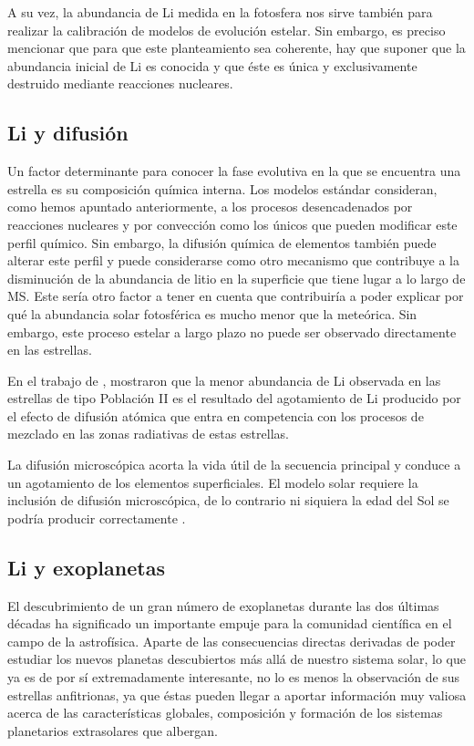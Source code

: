 A su vez, la abundancia de Li medida en la fotosfera nos sirve también para realizar la calibración de modelos de evolución estelar. Sin embargo, es preciso mencionar que para que este planteamiento sea coherente, hay que suponer que la abundancia inicial de Li es conocida y que éste es única y exclusivamente destruido mediante reacciones nucleares.\par

\subsection{Li y difusión}
Un factor determinante para conocer la fase evolutiva en la que se encuentra una estrella es su composición química interna. Los modelos estándar consideran, como hemos apuntado anteriormente, a los procesos desencadenados por reacciones nucleares y por convección como los únicos que pueden modificar este perfil químico. Sin embargo, la difusión química de elementos también puede alterar este perfil y puede considerarse como otro mecanismo que contribuye a la disminución de la abundancia de litio en la superficie que tiene lugar a lo largo de MS. Este sería otro factor a tener en cuenta que contribuiría a poder explicar por qué la abundancia solar fotosférica es mucho menor que la meteórica. Sin embargo, este proceso estelar a largo plazo no puede ser observado directamente en las estrellas.\par

En el trabajo de \cite{Richard2004}, mostraron que la menor abundancia de Li observada en las estrellas de tipo Población II es el resultado del agotamiento de Li producido por el efecto de difusión atómica que entra en competencia con los procesos de mezclado en las zonas radiativas de estas estrellas.\par

La difusión microscópica acorta la vida útil de la secuencia principal y conduce a un agotamiento de los elementos superficiales. El modelo solar requiere la inclusión de difusión microscópica, de lo contrario ni siquiera la edad del Sol se podría producir correctamente \cite{Thoul1993}.\par

\subsection{Li y exoplanetas}
El descubrimiento de un gran número de exoplanetas durante las dos últimas décadas \cite{Mayor1995, Bonfils2018} ha significado un importante empuje para la comunidad científica en el campo de la astrofísica. Aparte de las consecuencias directas derivadas de poder estudiar los nuevos planetas descubiertos más allá de nuestro sistema solar, lo que ya es de por sí extremadamente interesante, no lo es menos la observación de sus estrellas anfitrionas, ya que éstas pueden llegar a aportar información muy valiosa acerca de las características globales, composición y formación de los sistemas planetarios extrasolares que albergan.\par

